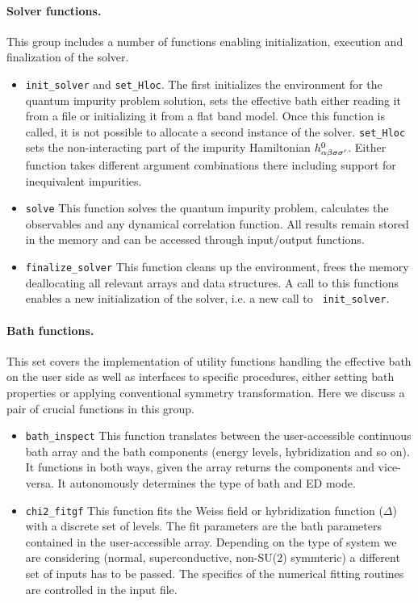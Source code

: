 \documentclass[edipack_sp.tex]{subfiles}
\begin{document}
\paragraph{{\bf Solver functions}.}
This group includes a number of functions enabling initialization,
execution and finalization  of the \NAME solver.
\begin{itemize}
  \item {\tt init\_solver} and {\tt set\_Hloc}. The first 
    initializes the \NAME environment for the quantum impurity problem
    solution, sets the effective bath either reading it from a file or
    initializing it from a flat band model. Once this function is
    called, it is not possible to allocate a second instance of the solver.
    {\tt set\_Hloc} sets the
    non-interacting part of the impurity Hamiltonian $h^0_{\alpha\beta\sigma\sigma'}$. 
    Either function takes different argument combinations there
    including support for inequivalent impurities.

  \item {\tt solve} This function solves the quantum impurity problem,
    calculates the observables and any dynamical correlation
    function. All results remain stored in the memory and can be accessed
    through input/output functions.

  \item {\tt finalize\_solver} This function cleans up the \NAME
    environment, frees the memory deallocating all relevant arrays and
    data structures. A call to this functions enables a new
    initialization of the solver, i.e. a new call to {\tt
      init\_solver}.  
  \end{itemize}


\paragraph{{\bf Bath functions}.}
This set covers the implementation of utility functions handling the
effective bath on the user side as well as interfaces to specific
\NAME procedures, either setting bath properties or applying
conventional symmetry transformation. Here we discuss 
a pair of crucial functions in this group.
\begin{itemize}
\item {\tt bath\_inspect} This function translates between the
  user-accessible continuous bath array and the bath components
  (energy levels, hybridization and so on). It functions in both ways,
  given the array returns the components and vice-versa. It
  autonomously determines the type of bath and ED mode.

\item {\tt chi2\_fitgf}
  This function fits the Weiss field or hybridization function ($\Delta$)
  with a discrete set of levels. The fit parameters are the bath
  parameters contained in the user-accessible array. Depending on the
  type of system we are considering (normal, superconductive,
  non-SU(2) symmteric) a different set of inputs has to be passed. The specifics
  of the numerical fitting routines are controlled in the input file.
  \end{itemize}
\end{document}
